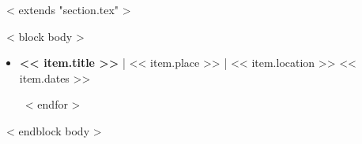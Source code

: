 ~< extends "section.tex" >~

~< block body >~
  \begin{itemize}
    ~< for item in items >~
      \item \textbf{<< item.title >>} | << item.place >> | << item.location >> \hfill << item.dates >>
        \iffalse
        \begin{itemize}
          ~< for detail in item.details ->~
            \item <<detail>>
          ~<- endfor ->~
        \end{itemize}
        \fi
    ~< endfor >~
  \end{itemize}
~< endblock body >~
